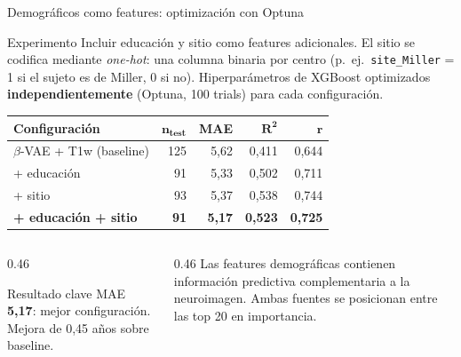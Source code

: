 \documentclass[aspectratio=169, 11pt]{beamer}
\newcommand{\highlight}[1]{\textcolor{uncaccent}{\textbf{#1}}}
\begin{document}
\begin{frame}{Demográficos como features: optimización con Optuna}
  \begin{block}{Experimento}
    {\small Incluir educación y sitio como features adicionales. El sitio se codifica mediante \textit{one-hot}: una columna binaria por centro (p.~ej.\ \texttt{site\_Miller} = 1 si el sujeto es de Miller, 0 si no). Hiperparámetros de XGBoost optimizados \textbf{independientemente} (Optuna, 100 trials) para cada configuración.}
  \end{block}

  \vspace{0.2cm}
  \centering
  {\small
  \begin{tabular}{lrrrr}
    \toprule
    \textbf{Configuración} & $\boldsymbol{n_{\text{test}}}$ & \textbf{MAE} & $\boldsymbol{R^2}$ & $\boldsymbol{r}$ \\
    \midrule
    $\beta$-VAE + T1w (baseline) & 125 & 5,62 & 0,411 & 0,644 \\
    + educación & 91 & 5,33 & 0,502 & 0,711 \\
    + sitio & 93 & 5,37 & 0,538 & 0,744 \\
    \rowcolor{unclight}
    \textbf{+ educación + sitio} & \textbf{91} & \highlight{5,17} & \textbf{0,523} & \textbf{0,725} \\
    \bottomrule
  \end{tabular}}

  \vspace{0.3cm}
  \begin{columns}[T]
    \begin{column}{0.46\textwidth}
      \begin{block}{Resultado clave}
        {\small MAE \highlight{5,17}: mejor configuración. Mejora de 0,45 años sobre baseline.}
      \end{block}
    \end{column}
    \begin{column}{0.46\textwidth}
      {\small Las features demográficas contienen información predictiva complementaria a la neuroimagen. Ambas fuentes se posicionan entre las top 20 en importancia.}
    \end{column}
  \end{columns}
\end{frame}
\end{document}
